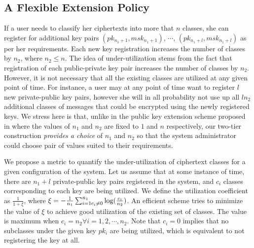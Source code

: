 \subsection{A Flexible Extension Policy}
\label{subsec:extension}

If a user needs to classify her ciphertexts into more that $n$ classes, she can register for additional key pairs $(pk_{n_1+1},msk_{n_1+1})$, $\cdots$, $(pk_{n_1+l},msk_{n_1+l})$ as per her requirements. Each new key registration increases the number of classes by $n_2$, where $n_2\leq n$. The idea of under-utilization stems from the fact that registration of each public-private key pair increases the number of classes by $n_2$. However, it is not necessary that all the existing classes are utilized at any given point of time. For instance, a user may at any point of time want to register $l$ new private-public key pairs, however she will in all probability not use up all $ln_2$ additional classes of messages that could be encrypted using the newly registered keys. We stress here is that, unlike in the public key extension scheme proposed in \cite{chu2014key} where the values of $n_1$ and $n_2$ are fixed to $1$ and $n$ respectively, our two-tier construction \emph{provides a choice} of $n_1$ and $n_2$ so that the system administrator could choose pair of values suited to their requirements. 

We propose a metric to quantify the under-utilization of ciphertext classes for a given configuration of the system. Let us assume that at some instance of time, there are $n_1+l$ private-public key pairs registered in the system, and $c_i$ classes corresponding to each key are being utilized. We define the utilization coefficient as $\frac{1}{1+\xi}$, where $\xi=-\frac{1}{n_1}\sum_{i=1\\c_i\neq0}^{n_1}\log(\frac{c_i}{n_2})$. An efficient scheme tries to minimize the value of $\xi$ to achieve good utilization of the existing set of classes. The value is maximum when $c_i=n_2 \forall i=1,2,\cdots,n_2$. Note that $c_i=0$ implies that no subclasses under the given key $pk_i$ are being utilized, which is equivalent to not registering the key at all.        


